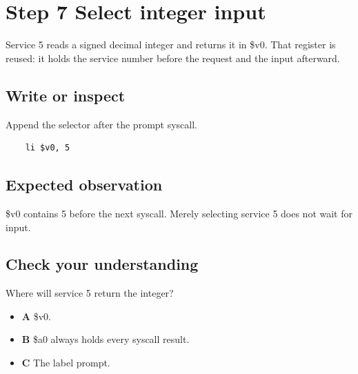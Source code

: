 \section{Step 7 Select integer
  input}\label{001-console-calculation-s07-step-7-select-integer-input}

Service 5 reads a signed decimal integer and returns it in \$v0. That
register is reused: it holds the service number before the request and
the input afterward.

\subsection{Write or
  inspect}\label{001-console-calculation-s07-write-or-inspect}

Append the selector after the prompt syscall.

\begin{verbatim}
    li $v0, 5
\end{verbatim}

\subsection{Expected
  observation}\label{001-console-calculation-s07-expected-observation}

\$v0 contains 5 before the next syscall. Merely selecting service 5 does
not wait for input.

\subsection{Check your
  understanding}\label{001-console-calculation-s07-check-your-understanding}

Where will service 5 return the integer?

\begin{itemize}
  \tightlist
  \item
        \textbf{A} \$v0.
  \item
        \textbf{B} \$a0 always holds every syscall result.
  \item
        \textbf{C} The label prompt.
\end{itemize}
